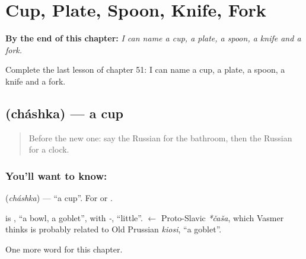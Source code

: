 
\chapter{Cup, Plate, Spoon, Knife, Fork}
\label{ch:ru-cup-plate-spoon-knife-fork}

\begin{chapteropening}
\textbf{By the end of this chapter:} \emph{I can name a cup, a plate, a spoon, a knife and a fork.}

Complete the last lesson of chapter 51: I can name a cup, a plate, a spoon, a knife and a fork.
\end{chapteropening}

\section[\texorpdfstring{\ru{чашка} (cháshka)}{чашка (cháshka)}]{ (cháshka) — a cup}

\label{lesson:RU-C51-cup}



\begin{quote}
Before the new one: say the Russian for the bathroom, then the Russian for a clock.
\end{quote}

\subsection*{You'll want to know: }
\textbf{} (\emph{cháshka}) — \textquotedblleft{}a cup\textquotedblright{}. For \textbf{} or \textbf{}.

\begin{cousinweb}
\textbf{} is \emph{}, \textquotedblleft{}a bowl, a goblet\textquotedblright{}, with \emph{-}, \textquotedblleft{}little\textquotedblright{}. \emph{} $\leftarrow$ Proto-Slavic \emph{*čaša}, which Vasmer thinks is probably related to Old Prussian \emph{kiosi}, \textquotedblleft{}a goblet\textquotedblright{}.
\end{cousinweb}

\begin{grammarlens}[title={What you've built}]
One more word for this chapter.
\end{grammarlens}


